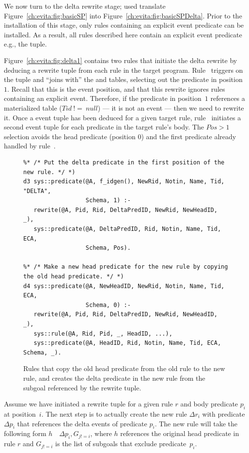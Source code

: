 We now turn to the delta rewrite \OVERLOG stage; used translate
Figure~\ref{ch:evita:fig:basicSP} into Figure~\ref{ch:evita:fig:basicSPDelta}.
Prior to the installation of this stage, only rules containing an explicit
event predicate can be installed.  As a result, all rules described here
contain an explicit event predicate e.g., the  tuple.

Figure~\ref{ch:evita:fig:delta1} contains two rules that initiate the delta
rewrite by deducing a rewrite tuple from each rule in the target program.
Rule~ triggers on the  tuple and ``joins with''
the  and  tables, selecting out the predicate in
position~$1$.  Recall that this is the event position, and that this rewrite
ignores rules containing an explicit event.  Therefore, if the predicate in
position~$1$ references a materialized table ($Tid\ !=\ null$) --- it is not an
event --- then we need to rewrite it.  Once a  event tuple has been
deduced for a given target rule, rule~ initiates a second 
event tuple for each predicate in the target rule's body.  The $Pos > 1$
selection avoids the head predicate (position $0$) and the first predicate
already handled by rule~.

\begin{figure}[!t]
\ssp
\centering
\begin{lstlisting}
%* /* Put the delta predicate in the first position of the new rule. */ *)
d3 sys::predicate(@A, f_idgen(), NewRid, Notin, Name, Tid, "DELTA", 
                  Schema, 1) :-
   rewrite(@A, Pid, Rid, DeltaPredID, NewRid, NewHeadID, _),
   sys::predicate(@A, DeltaPredID, Rid, Notin, Name, Tid, ECA, 
                  Schema, Pos).

%* /* Make a new head predicate for the new rule by copying the old head predicate. */ *)
d4 sys::predicate(@A, NewHeadID, NewRid, Notin, Name, Tid, ECA, 
                  Schema, 0) :-
   rewrite(@A, Pid, Rid, DeltaPredID, NewRid, NewHeadID, _),
   sys::rule(@A, Rid, Pid, _, HeadID, ...),
   sys::predicate(@A, HeadID, Rid, Notin, Name, Tid, ECA, Schema, _).
\end{lstlisting}
\caption{\label{ch:evita:fig:delta2}Rules that copy the old head predicate from the old rule
to the new rule, and creates the delta predicate in the new rule from the subgoal referenced
by the rewrite tuple.}
\end{figure}

Assume we have initiated a rewrite tuple for a given rule $r$ and body
predicate $p_i$ at position~$i$.  The next step is to actually create the new
rule $\Delta r_i$ with predicate $\Delta p_i$ that references the delta events of
predicate $p_i$.  The new rule will take the following form $h$~\ol{:-}~$\Delta
p_i, G_{j!=i}$, where $h$ references the original head predicate in rule $r$
and $G_{j!=i}$ is the list of subgoals that exclude predicate~$p_i$.

